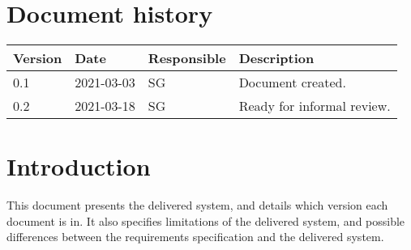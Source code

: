 \documentclass{article}
\date {#1}
\title {
    \documentNumber {01}    
    
    \documentVersion {0.1}
    
    \documentTitle {Template}
    \documentGroup {2}
    
    \documentResponsible {System Group}
    \documentAuthors {System group}
    
    \documentDate {2021-03-18}
}
\begin{document}
\maketitle
\thispagestyle{empty}

\newpage

\tableofcontents

\newpage



\section{Document history}

\begin{tabular}{ l | l | l | l }
    Version & Date & Responsible & Description \\
    \hline
    0.1 & 2021-03-03 & SG & Document created. \\
    \hline
    0.2 & 2021-03-18 & SG & Ready for informal review.
   
\end{tabular}

\section{Introduction}
    This document presents the delivered system, and details which version each document is in. It also specifies limitations of the delivered system, and possible differences between the requirements specification and the delivered system.
\end{document}

